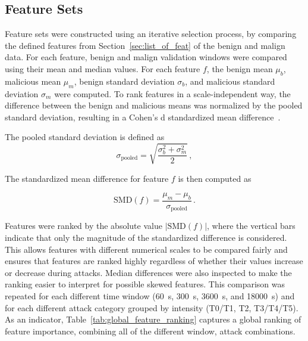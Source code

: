 \subsection{Feature Sets}


Feature sets were constructed using an iterative selection process, by comparing the defined features from Section~\ref{sec:list_of_feat} of the benign and malign data. For each feature, benign and malign validation windows were compared using their mean and median values. For each feature $f$, the benign mean $\mu_b$, malicious mean $\mu_m$, benign standard deviation $\sigma_b$, and malicious standard deviation $\sigma_m$ were computed. To rank features in a scale-independent way, the difference between the benign and malicious means was normalized by the pooled standard deviation, resulting in a Cohen's d  standardized mean difference~\cite{lakens_calculating_2013}.

The pooled standard deviation is defined as
\[
\sigma_{\mathrm{pooled}} =
\sqrt{\frac{\sigma_b^2 + \sigma_m^2}{2}}\, ,
\]

The standardized mean difference for feature $f$ is then computed as

\[
\mathrm{SMD}(f) =
\frac{\mu_m - \mu_b}{\sigma_{\mathrm{pooled}}}\, .
\]

Features were ranked by the absolute value $|\mathrm{SMD}(f)|$, where the vertical bars indicate that only the magnitude of the standardized difference is considered. This allows features with different numerical scales to be compared fairly and ensures that features are ranked highly regardless of whether their values increase or decrease during attacks. Median differences were also inspected to make the ranking easier to interpret for possible skewed features. This comparison was repeated for each different time window (\SI{60}{s}, \SI{300}{s}, \SI{3600}{s}, and \SI{18000}{s}) and for each different attack category grouped by intensity (T0/T1, T2, T3/T4/T5). As an indicator, Table~\ref{tab:global_feature_ranking} captures a global ranking of feature importance, combining all of the different window, attack combinations.




